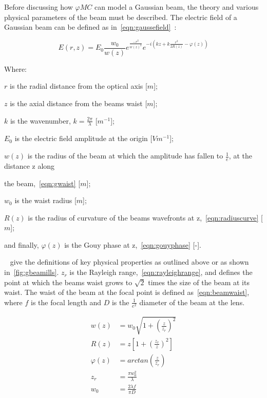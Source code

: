 Before discussing how $\varphi MC$ can model a Gaussian beam, the theory and various physical parameters of the beam must be described. 
The electric field of a Gaussian beam can be defined as in~\cref{eqn:gaussefield}~\cite{milonni2010laser}:

\begin{equation}
E(r,z)=E_0\frac{w_0}{w(z)}e^{\frac{-r^2}{w(z)^2}}e^{-i(kz+k\frac{r^2}{2R(z)}-\varphi(z))}
\label{eqn:gaussefield}
\end{equation}

\noindent Where:

    \indent $r$ is the radial distance from the optical axis [$m$];

    \indent $z$ is the axial distance from  the beams waist [$m$];

    \indent $k$ is the wavenumber, $k=\frac{2\pi}{\lambda}$ [$m^{-1}$];

    \indent $E_0$ is the electric field amplitude at the origin [$Vm^{-1}$];

    \indent $w(z)$ is the radius of the beam at which the amplitude has fallen to $\frac{1}{e}$, at the distance z along 

    \indent the beam,~\cref{eqn:gwaist} [$m$];

    \indent $w_0$ is the waist radius [$m$];

    \indent $R(z)$ is the radius of curvature of the beams wavefronts at z,~\cref{eqn:radiuscurve} [$m$];

    \indent and finally, $\varphi(z)$ is the Gouy phase at z,~\cref{eqn:gouyphase} [-].

\medskip

~ give the definitions of key physical properties as outlined above or as shown in~\cref{fig:gbeamills}. 
$z_r$ is the Rayleigh range,~\cref{eqn:rayleighrange}, and defines the point at which the beams waist grows to $\sqrt{2}$ times the size of the beam at its waist.
The waist of the beam at the focal point is defined as~\cref{eqn:beamwaist}, where $f$ is the focal length and $D$ is the $\tfrac{1}{e^2}$ diameter of the beam at the lens.

\begin{align}
    w(z) &= w_0\sqrt{1+\left(\frac{z}{z_r}\right)^2} \label{eqn:gwaist} \\
    R(z) &= z\left[1+\left(\frac{z_r}{z}\right)^2\right]\label{eqn:radiuscurve}\\
    \varphi(z) &= arctan\left(\frac{z}{z_r}\right)\label{eqn:gouyphase}\\
    z_r &= \frac{\pi w_0^2}{\lambda}\label{eqn:rayleighrange}\\
    w_0 &= \frac{2\lambda f}{\pi D}\label{eqn:beamwaist}\\
\end{align}

